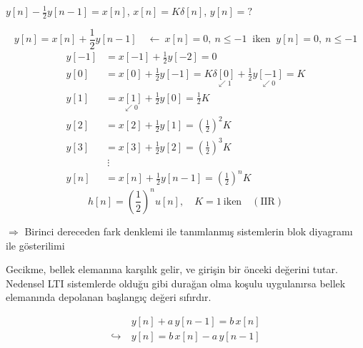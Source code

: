 \documentclass[11pt,a4paper]{article}
\begin{document}
\begin{ornek}[(Ex)]
$y[n] - \frac{1}{2}y[n-1] = x[n]$, \quad $x[n] = K\delta[n]$, \quad $y[n] = ?$
\end{ornek}
\begin{cozum}
\[ y[n] = x[n] + \frac{1}{2}y[n-1] \quad \longleftarrow \ x[n] = 0, \ n \leq -1 \ \text{ iken } \ y[n] = 0, \ n \leq -1 \]
\begin{align*}
  y[-1] &= x[-1] + \tfrac{1}{2}y[-2] = 0 \\
  y[0] &= x[0] + \tfrac{1}{2}y[-1] = K\underset{\swarrow 1}{\delta[0]} + \tfrac{1}{2}\underset{\swarrow 0}{y[-1]} = K \\
  y[1] &= \underset{\swarrow 0}{x[1]} + \tfrac{1}{2}y[0] = \tfrac{1}{2}K \\
  y[2] &= x[2] + \tfrac{1}{2}y[1] = \left(\tfrac{1}{2}\right)^2 K \\
  y[3] &= x[3] + \tfrac{1}{2}y[2] = \left(\tfrac{1}{2}\right)^3 K \\
  &\ \vdots \\
  y[n] &= x[n] + \tfrac{1}{2}y[n-1] = \left(\tfrac{1}{2}\right)^n K
\end{align*}
\[ h[n] = \left(\frac{1}{2}\right)^n u[n], \quad K = 1 \ \text{iken} \quad (\text{IIR}) \]
\end{cozum}

$\Rightarrow$ Birinci dereceden fark denklemi ile tanımlanmış sistemlerin blok diyagramı ile gösterilimi
\begin{center}
\end{center}
Gecikme, bellek elemanına karşılık gelir, ve girişin bir önceki değerini tutar. Nedensel LTI sistemlerde olduğu gibi durağan olma koşulu uygulanırsa bellek elemanında depolanan başlangıç değeri sıfırdır.

\noindent
\begin{minipage}[c]{0.4\linewidth}
\begin{align*}
  & y[n] + a\,y[n-1] = b\,x[n] \\
  \hookrightarrow\ & y[n] = b\,x[n] - a\,y[n-1]
\end{align*}
\end{minipage}\hfill
\begin{minipage}[c]{0.56\linewidth}
\centering
{}
\end{minipage}
\end{document}
